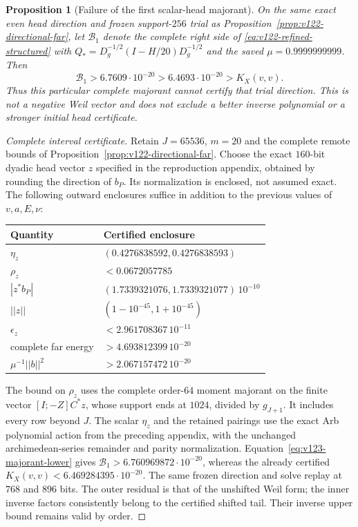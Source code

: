 \documentclass[11pt]{article}
\def\norm#1{||#1||}%
\newtheorem{proposition}[theorem]{Proposition}
\theoremstyle{remark}
\newcommand{\norm}[1]{\left\lVert #1\right\rVert}
\begin{document}
\begin{proposition}[Failure of the first scalar-head majorant]
\label{prop:v123-first-majorant-fails}
On the same exact even head direction and frozen support-$256$
trial as Proposition~\ref{prop:v122-directional-far}, let
$\mathcal B_1$ denote the complete right side of
\eqref{eq:v122-refined-structured} with
$Q_*=D_g^{-1/2}(I-H/20)D_g^{-1/2}$ and the saved
$\mu=0.9999999999$. Then
\begin{equation}\label{eq:v123-first-majorant-fails}
 \mathcal B_1>6.7609\cdot10^{-20}
 >6.4693\cdot10^{-20}>K_X(v,v).
\end{equation}
Thus this particular complete majorant cannot certify that trial
direction. This is not a negative Weil vector and does not exclude
a better inverse polynomial or a stronger initial head certificate.
\end{proposition}
\begin{proof}[Complete interval certificate]
Retain $J=65536$, $m=20$ and the complete remote bounds of
Proposition~\ref{prop:v122-directional-far}. Choose the exact
$160$-bit dyadic head vector $z$ specified in the reproduction
appendix, obtained by rounding the direction of $b_P$. Its
normalization is enclosed, not assumed exact. The following
outward enclosures suffice in addition to the previous values of
$v,a,E,\nu$:
\begin{center}
\begin{tabular}{@{}ll@{}}
\toprule Quantity & Certified enclosure\\\midrule
$\eta_z$ & $(0.4276838592,0.4276838593)$\\
$\rho_z$ & $<0.0672057785$\\
$|z^*b_P|$ & $(1.7339321076,1.7339321077)\,10^{-10}$\\
$\norm z$ & $(1-10^{-45},1+10^{-45})$\\
$\epsilon_z$ & $<2.961708367\,10^{-11}$\\
complete far energy & $>4.693812399\,10^{-20}$\\
$\mu^{-1}\norm b^2$ & $>2.067157472\,10^{-20}$\\\bottomrule
\end{tabular}
\end{center}
The bound on $\rho_z$ uses the complete order-$64$ moment
majorant on the finite vector $[I;-Z]C^*z$, whose support ends
at $1024$, divided by $g_{J+1}$. It includes every row beyond
$J$. The scalar $\eta_z$ and the retained pairings use the exact
Arb polynomial action from the preceding appendix, with the
unchanged archimedean-series remainder and parity normalization.
Equation~\eqref{eq:v123-majorant-lower} gives
$\mathcal B_1>6.760969872\cdot10^{-20}$, whereas the already
certified $K_X(v,v)<6.469284395\cdot10^{-20}$.
The same frozen direction and solve replay at $768$ and $896$
bits. The outer residual is that of the unshifted Weil form;
the inner inverse factors consistently belong to the certified
shifted tail. Their inverse upper bound remains valid by order.
\end{proof}
\end{document}
